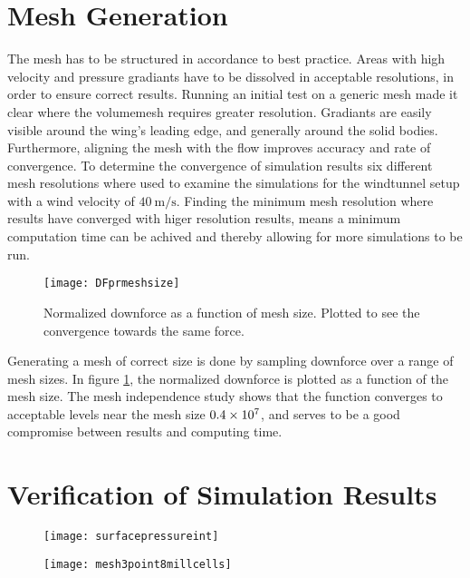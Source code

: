 \section{Mesh Generation}
\label{sec:mesh}
  The mesh has to be structured in accordance to best practice. Areas with high velocity and pressure gradiants have to be dissolved in acceptable resolutions, in order to ensure correct results. Running an initial test on a generic mesh made it clear where the volumemesh requires greater resolution. Gradiants are easily visible around the wing's leading edge, and generally around the solid bodies. Furthermore, aligning the mesh with the flow improves accuracy and rate of convergence. To determine the convergence of simulation results six different mesh resolutions where used to examine the simulations for the windtunnel setup with a wind velocity of $\SI{40}{\metre\per\second}$. Finding the minimum mesh resolution where results have converged with higer resolution results, means a minimum computation time can be achived and thereby allowing for more simulations to be run.

  \begin{figure}
    \texttt{[image: DFprmeshsize]}
    \caption{Normalized downforce as a function of mesh size. Plotted to see the convergence towards the same force.}
    \label{fig:DFprmeshsize}
  \end{figure}

  Generating a mesh of correct size is done by sampling downforce over a range of mesh sizes. In figure \ref{fig:DFprmeshsize}, the normalized downforce is plotted as a function of the mesh size. The mesh independence study shows that the function converges to acceptable levels near the mesh size $\SI{.4E7}{}$, and serves to be a good compromise between results and computing time.

  \section{Verification of Simulation Results}
  \label{sec:simulationcomparison}


  \begin{figure}
    \texttt{[image: surfacepressureint]}
    \label{fig:surfacepressureint}
  \end{figure}


  \begin{figure}
    \texttt{[image: mesh3point8millcells]}
    \label{fig:mesh3point8mill}
  \end{figure}


